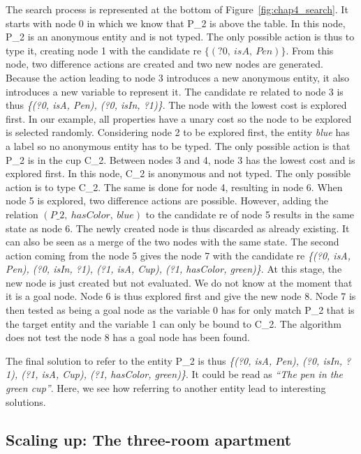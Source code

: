 The search process is represented at the bottom of Figure~\ref{fig:chap4_search}. It starts with node 0 in which we know that P\_2 is above the table. In this node, P\_2 is an anonymous entity and is not typed. The only possible action is thus to type it, creating node 1 with the candidate \acrshort{re} $\{(?0,\ isA,\ Pen)\}$. From this node, two difference actions are created and two new nodes are generated. Because the action leading to node 3 introduces a new anonymous entity, it also introduces a new variable to represent it. The candidate \acrshort{re} related to node 3 is thus \textit{\{(?0, isA, Pen), (?0, isIn, ?1)\}}. The node with the lowest cost is explored first. In our example, all properties have a unary cost so the node to be explored is selected randomly. Considering node 2 to be explored first, the entity \textit{blue} has a label so no anonymous entity has to be typed. The only possible action is that P\_2 is in the cup C\_2. Between nodes 3 and 4, node 3 has the lowest cost and is explored first. In this node, C\_2 is anonymous and not typed. The only possible action is to type C\_2. The same is done for node 4, resulting in node 6. When node 5 is explored, two difference actions are possible. However, adding the relation $(P\_2,\ hasColor,\ blue)$ to the candidate \acrshort{re} of node 5 results in the same state as node 6. The newly created node is thus discarded as already existing. It can also be seen as a merge of the two nodes with the same state. The second action coming from the node 5 gives the node 7 with the candidate \acrshort{re} \textit{\{(?0, isA, Pen), (?0, isIn, ?1), (?1, isA, Cup), (?1, hasColor, green)\}}. At this stage, the new node is just created but not evaluated. We do not know at the moment that it is a goal node. Node 6 is thus explored first and give the new node 8. Node 7 is then tested as being a goal node as the variable 0 has for only match P\_2 that is the target entity and the variable 1 can only be bound to C\_2. The algorithm does not test the node 8 has a goal node has been found.

The final solution to refer to the entity P\_2 is thus \textit{\{(?0, isA, Pen), (?0, isIn, ?1), (?1, isA, Cup), (?1, hasColor, green)\}}. It could be read as \textit{``The pen in the green cup''}. Here, we see how referring to another entity lead to interesting solutions.


\subsection{Scaling up: The three-room apartment}

